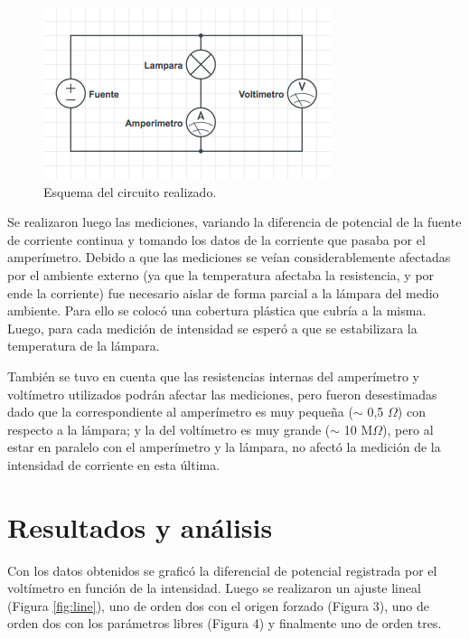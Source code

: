 \documentclass[twoside,twocolumn,a4paper]{article}
\begin{document}
\begin{figure}[h]
\includegraphics[width=\linewidth]{dispositivo_experimental.jpg}
\caption{Esquema del circuito realizado.}
\label{fig:dsp_exp}
\end{figure}

Se realizaron luego las mediciones, variando la diferencia de potencial de la fuente de corriente continua y tomando los datos de la corriente que pasaba por el amper\'imetro. Debido a que las mediciones se ve\'ian considerablemente afectadas por el ambiente externo (ya que la temperatura afectaba la resistencia, y por ende la corriente) fue necesario aislar de forma parcial a la l\'ampara del medio ambiente. Para ello se coloc\'o una cobertura pl\'astica que cubr\'ia a la misma. Luego, para cada medici\'on de intensidad se esper\'o a que se estabilizara la temperatura de la l\'ampara.

\par 
 Tambi\'en se tuvo en cuenta que las resistencias internas del amper\'imetro y volt\'imetro utilizados podr\'an afectar las mediciones, pero fueron desestimadas dado que la correspondiente al amper\'imetro es muy peque\~na ($\sim$ 0,5 $\Omega$) con respecto a la l\'ampara; y la del volt\'imetro es muy grande ($\sim$ 10 M$\Omega$), pero al estar en paralelo con el amper\'imetro y la l\'ampara, no afect\'o la medici\'on de la intensidad de corriente en esta \'ultima.

\section{Resultados y an\'alisis}

Con los datos obtenidos se grafic\'o la diferencial de potencial registrada por el volt\'imetro en funci\'on de la intensidad. Luego se realizaron un ajuste lineal (Figura \ref{fig:line}), uno de orden dos con el origen forzado (Figura 3), uno de orden dos con los par\'ametros libres (Figura 4) y finalmente uno de orden tres.\par
\end{document}
